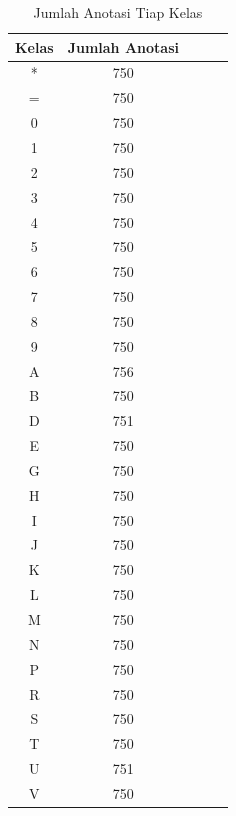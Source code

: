 \begin{center}
  \begin{longtable}[c]{|c|c|c|c|c|}
  \caption{Jumlah Anotasi Tiap Kelas}
  \label{tb:anotasitiapkelas}\\
  \hline
  \textbf{Kelas} & \textbf{Jumlah Anotasi} \\ \hline
  \endhead
  *             & 750             \\ \hline
  =             & 750             \\ \hline
  0             & 750             \\ \hline
  1             & 750             \\ \hline
  2             & 750             \\ \hline
  3             & 750             \\ \hline
  4             & 750             \\ \hline
  5             & 750             \\ \hline
  6             & 750             \\ \hline
  7             & 750             \\ \hline
  8             & 750             \\ \hline
  9             & 750             \\ \hline
  A             & 756             \\ \hline
  B             & 750             \\ \hline
  D             & 751             \\ \hline
  E             & 750             \\ \hline
  G             & 750             \\ \hline
  H             & 750             \\ \hline
  I             & 750             \\ \hline
  J             & 750             \\ \hline
  K             & 750             \\ \hline
  L             & 750             \\ \hline
  M             & 750             \\ \hline
  N             & 750             \\ \hline
  P             & 750             \\ \hline
  R             & 750             \\ \hline
  S             & 750             \\ \hline
  T             & 750             \\ \hline
  U             & 751             \\ \hline
  V             & 750             \\ \hline
  \end{longtable}
\end{center}

